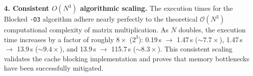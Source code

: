 \documentclass[10pt,a4paper]{article}
\begin{document}
\textbf{4. Consistent $O(N^3)$ algorithmic scaling.}
The execution times for the Blocked \texttt{-O3} algorithm adhere nearly perfectly to the theoretical $\mathcal{O}(N^3)$ computational complexity of matrix multiplication. As $N$ doubles, the execution time increases by a factor of roughly $8\times$ ($2^3$): 0.19\,s $\rightarrow$ 1.47\,s ($\sim 7.7\times$), 1.47\,s $\rightarrow$ 13.9\,s ($\sim 9.4\times$), and 13.9\,s $\rightarrow$ 115.7\,s ($\sim 8.3\times$). This consistent scaling validates the cache blocking implementation and proves that memory bottlenecks have been successfully mitigated.
\end{document}
